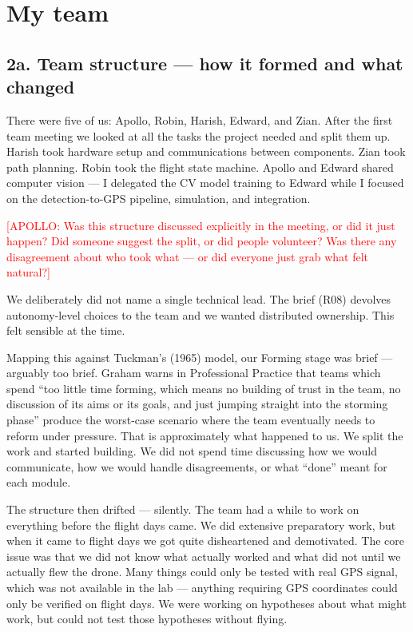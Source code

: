 \section{My team}


\subsection{2a. Team structure --- how it formed and what changed}

There were five of us: Apollo, Robin, Harish, Edward, and Zian. After the first team meeting we looked at all the tasks the project needed and split them up. Harish took hardware setup and communications between components. Zian took path planning. Robin took the flight state machine. Apollo and Edward shared computer vision --- I delegated the CV model training to Edward while I focused on the detection-to-GPS pipeline, simulation, and integration.

\textcolor{red}{[APOLLO: Was this structure discussed explicitly in the meeting, or did it just happen? Did someone suggest the split, or did people volunteer? Was there any disagreement about who took what --- or did everyone just grab what felt natural?]}

We deliberately did not name a single technical lead. The brief (R08) devolves autonomy-level choices to the team and we wanted distributed ownership. This felt sensible at the time.

Mapping this against Tuckman's (1965) model, our Forming stage was brief --- arguably too brief. Graham warns in Professional Practice that teams which spend ``too little time forming, which means no building of trust in the team, no discussion of its aims or its goals, and just jumping straight into the storming phase'' produce the worst-case scenario where the team eventually needs to reform under pressure. That is approximately what happened to us. We split the work and started building. We did not spend time discussing how we would communicate, how we would handle disagreements, or what ``done'' meant for each module.

The structure then drifted --- silently. The team had a while to work on everything before the flight days came. We did extensive preparatory work, but when it came to flight days we got quite disheartened and demotivated. The core issue was that we did not know what actually worked and what did not until we actually flew the drone. Many things could only be tested with real GPS signal, which was not available in the lab --- anything requiring GPS coordinates could only be verified on flight days. We were working on hypotheses about what might work, but could not test those hypotheses without flying.

